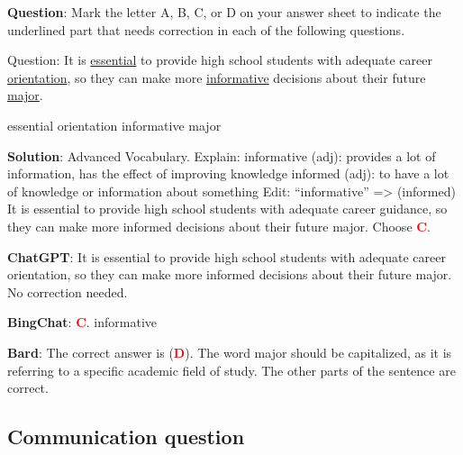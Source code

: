 \documentclass[11pt]{article}
\begin{document}
\begin{mdframed}[linewidth=1pt,linecolor=red] \textbf{Question}: Mark the letter A, B, C, or D on your answer sheet to indicate the underlined part that needs correction in each of the following questions.
	
	Question: It is \underline{essential} to provide high school students with adequate career \underline{orientation}, so they can make more \underline{informative} decisions about their future \underline{major}.

	\begin{choices}
		\choice essential	
		\choice orientation	
		\choice informative	
		\choice major  
	\end{choices}
	
	\textbf{Solution}: Advanced Vocabulary.
	Explain:
	informative (adj): provides a lot of information, has the effect of improving knowledge
	informed (adj): to have a lot of knowledge or information about something
	Edit: “informative” => (informed)
	It is essential to provide high school students with adequate career guidance, so they can make more informed decisions about their future major. Choose \textcolor{red}{\textbf{C}}. 
	
	\textbf{ChatGPT}: It is essential to provide high school students with adequate career orientation, so they can make more informed decisions about their future major. No correction needed.
	
	\textbf{BingChat}: \textcolor{red}{\textbf{C}}. informative
	
	\textbf{Bard}: The correct answer is (\textcolor{red}{\textbf{D}}). The word major should be capitalized, as it is referring to a specific academic field of study. The other parts of the sentence are correct. 
	
\end{mdframed}

\subsection{Communication question}
\end{document}
